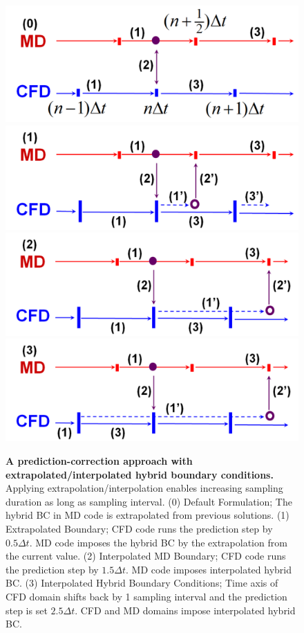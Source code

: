 \documentclass[preprint,12pt]{elsarticle}
\begin{document}
\begin{figure}
\centering
\includegraphics[width=0.7\linewidth]{Prediction_Correction_Org.pdf}
\includegraphics[width=0.7\linewidth]{Prediction_Correction_Extra_Simple.pdf}
\includegraphics[width=0.7\linewidth]{Prediction_Correction_Inter_Simple.pdf}
\includegraphics[width=0.7\linewidth]{Prediction_Correction_Both_Simple.pdf}
\caption{\small {\bf A prediction-correction approach with extrapolated/interpolated hybrid boundary conditions.} Applying extrapolation/interpolation enables increasing sampling duration as long as sampling interval. (0) Default Formulation;
The hybrid BC in MD code is extrapolated from previous solutions.
(1) Extrapolated Boundary; CFD code runs the prediction step by $0.5{\Delta}t$. MD code imposes the hybrid BC by the extrapolation from the current value. (2) Interpolated MD Boundary; CFD code runs the prediction step by $1.5{\Delta}t$. MD code imposes interpolated hybrid BC. (3) Interpolated Hybrid Boundary Conditions; Time axis of CFD domain shifts back by 1 sampling interval and the prediction step is set $2.5{\Delta}t$. CFD and MD domains impose interpolated hybrid BC.}
\label{Hybrid_Timescale2}
\end{figure}
\end{document}
